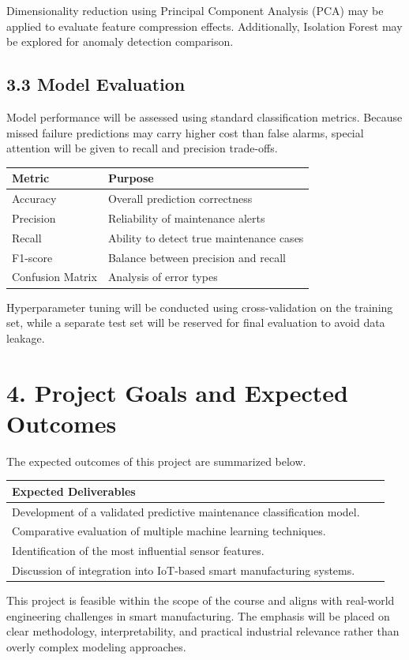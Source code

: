 \documentclass[12pt]{article}
\begin{document}
Dimensionality reduction using Principal Component Analysis (PCA) may be applied to evaluate feature compression effects. Additionally, Isolation Forest may be explored for anomaly detection comparison.

\subsection*{3.3 Model Evaluation}

Model performance will be assessed using standard classification metrics. Because missed failure predictions may carry higher cost than false alarms, special attention will be given to recall and precision trade-offs.

\begin{table}[ht]
\centering
\begin{tabular}{ll}
\toprule
\textbf{Metric} & \textbf{Purpose} \\
\midrule
Accuracy & Overall prediction correctness \\
Precision & Reliability of maintenance alerts \\
Recall & Ability to detect true maintenance cases \\
F1-score & Balance between precision and recall \\
Confusion Matrix & Analysis of error types \\
\bottomrule
\end{tabular}
\end{table}

Hyperparameter tuning will be conducted using cross-validation on the training set, while a separate test set will be reserved for final evaluation to avoid data leakage.

\section*{4. Project Goals and Expected Outcomes}

The expected outcomes of this project are summarized below.

\begin{table}[ht]
\centering
\begin{tabular}{p{0.95\linewidth}}
\toprule
\textbf{Expected Deliverables} \\
\midrule
Development of a validated predictive maintenance classification model. \\
Comparative evaluation of multiple machine learning techniques. \\
Identification of the most influential sensor features. \\
Discussion of integration into IoT-based smart manufacturing systems. \\
\bottomrule
\end{tabular}
\end{table}

This project is feasible within the scope of the course and aligns with real-world engineering challenges in smart manufacturing. The emphasis will be placed on clear methodology, interpretability, and practical industrial relevance rather than overly complex modeling approaches.
\end{document}
